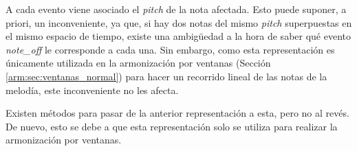 \begin{enumerate}
    A cada evento viene asociado el \textit{pitch} de la nota afectada. Esto puede suponer, a priori, un inconveniente, ya que, si hay dos notas del mismo \textit{pitch} superpuestas en el mismo espacio de tiempo, existe una ambigüedad a la hora de saber qué evento \textit{note\_off} le corresponde a cada una. Sin embargo, como esta representación es únicamente utilizada en la armonización por ventanas (Sección \ref{arm:sec:ventanas_normal}) para hacer un recorrido lineal de las notas de la melodía, este inconveniente no les afecta. 

    Existen métodos para pasar de la anterior representación a esta, pero no al revés. De nuevo, esto se debe a que esta representación solo se utiliza para realizar la armonización por ventanas.
\end{enumerate}